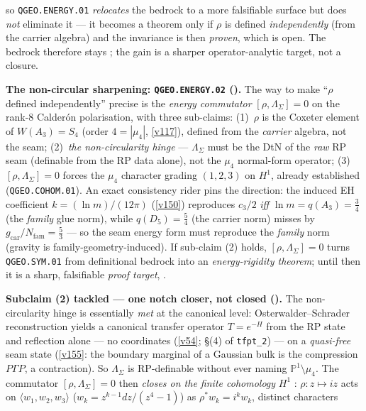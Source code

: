 \documentclass[11pt,a4paper]{article}
\newcommand{\Nfam}{N_{\mathrm{fam}}}
\newcommand{\PP}{\mathbb P^1}
\begin{document}
\begin{keybox}
so \texttt{QGEO.ENERGY.01} \emph{relocates} the bedrock to a more falsifiable surface but does \emph{not}
eliminate it --- it becomes a theorem only if $\rho$ is defined \emph{independently} (from the carrier
algebra) and the invariance is then \emph{proven}, which is open. The bedrock therefore stays \mO; the gain
is a sharper operator-analytic target, not a closure.
\par\smallskip\noindent\textbf{The non-circular sharpening: \texttt{QGEO.ENERGY.02}
().} The way to make ``$\rho$ defined independently'' precise is the
\emph{energy commutator} $[\rho,\Lambda_\Sigma]=0$ on the rank-$8$ Calder\'on polarisation, with three
sub-claims: (1)~$\rho$ is the Coxeter element of $W(A_3)=S_4$ (order $4=|\mu_4|$, \vref{v117}), defined from
the \emph{carrier} algebra, not the seam; (2)~\emph{the non-circularity hinge} --- $\Lambda_\Sigma$ must be
the DtN of the \emph{raw} RP seam (definable from the RP data alone), not the $\mu_4$ normal-form operator;
(3)~$[\rho,\Lambda_\Sigma]=0$ forces the $\mu_4$ character grading $(1,2,3)$ on $H^1$, already established
(\texttt{QGEO.COHOM.01}). An exact consistency rider pins the direction: the induced EH coefficient
$k=(\ln m)/(12\pi)$ (\vref{v150}) reproduces $c_3/2$ \emph{iff} $\ln m=q(A_3)=\tfrac34$ (the \emph{family}
glue norm), while $q(D_5)=\tfrac54$ (the carrier norm) misses by $g_{\mathrm{car}}/\Nfam=\tfrac53$ --- so
the seam energy form must reproduce the \emph{family} norm (gravity is family-geometry-induced). If
sub-claim (2) holds, $[\rho,\Lambda_\Sigma]=0$ turns \texttt{QGEO.SYM.01} from definitional bedrock into an
\emph{energy-rigidity theorem}; until then it is a sharp, falsifiable \emph{proof target}, \mO.
\par\smallskip\noindent\textbf{Subclaim (2) tackled --- one notch closer, not closed
().} The non-circularity hinge is essentially \emph{met} at the canonical
level: Osterwalder--Schrader reconstruction yields a canonical transfer operator $T=e^{-H}$ from the RP
state and reflection alone --- no coordinates (\vref{v54}; \S(4) of \texttt{tfpt\_2}) --- on a
\emph{quasi-free} seam state (\vref{v155}: the boundary marginal of a Gaussian bulk is the compression
$P\Gamma P$, a contraction). So $\Lambda_\Sigma$ is RP-definable without ever naming $\PP\!\setminus\!\mu_4$.
The commutator $[\rho,\Lambda_\Sigma]=0$ then \emph{closes on the finite cohomology} $H^1$ \mE: $\rho\!:\!z\mapsto iz$
acts on $\langle w_1,w_2,w_3\rangle$ ($w_k=z^{k-1}dz/(z^4-1)$) as $\rho^*w_k=i^k w_k$, distinct characters

\end{keybox}
\end{document}
